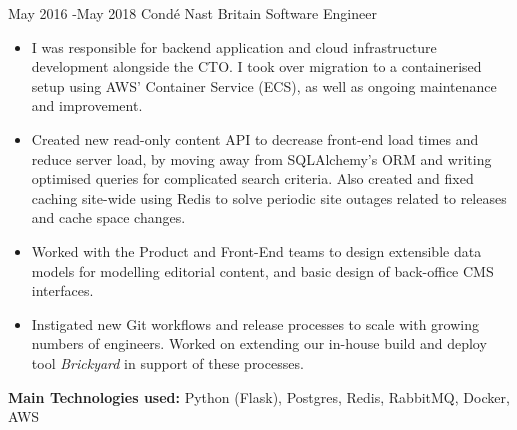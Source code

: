 \documentclass[10pt]{article} %
\begin{document}
\jobheader
{May 2016 -}{May 2018}
{Condé Nast Britain}
{Software Engineer}
\vspace{-1cm}
  \begin{itemize}

  \item I was responsible for backend application and cloud infrastructure development
        alongside the CTO. I took over migration to a containerised setup using AWS' Container Service (ECS), as well as ongoing maintenance and improvement.

  \item Created new read-only content API to decrease front-end load times and
        reduce server load, by moving away from SQLAlchemy's ORM and writing
        optimised queries for complicated search criteria. Also created and fixed
        caching site-wide using Redis to solve periodic site outages related to
        releases and cache space changes.

  \item Worked with the Product and Front-End teams to design extensible data models
        for modelling editorial content, and basic design of back-office CMS
        interfaces.

  \item Instigated new Git workflows and release processes to scale with growing
        numbers of engineers. Worked on extending our in-house build and deploy
        tool \textit{Brickyard} in support of these processes.

  \end{itemize}

  \textbf{Main Technologies used:}
  Python (Flask),
  Postgres, Redis, RabbitMQ, Docker, AWS


\clearpage
\end{document}
